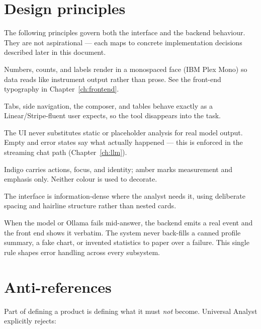 \section{Design principles}
The following principles govern both the interface and the backend behaviour.
They are not aspirational --- each maps to concrete implementation decisions
described later in this document.

\begin{description}[style=nextline,leftmargin=0pt]
  \item[\textcolor{uaIndigoD}{Readouts are exact.}]
    Numbers, counts, and labels render in a monospaced face (IBM Plex Mono) so
    data reads like instrument output rather than prose. See the front-end
    typography in Chapter~\ref{ch:frontend}.
  \item[\textcolor{uaIndigoD}{Earned familiarity.}]
    Tabs, side navigation, the composer, and tables behave exactly as a
    Linear/Stripe-fluent user expects, so the tool disappears into the task.
  \item[\textcolor{uaIndigoD}{No fabrication.}]
    The UI never substitutes static or placeholder analysis for real model
    output. Empty and error states say what actually happened --- this is
    enforced in the streaming chat path (Chapter~\ref{ch:llm}).
  \item[\textcolor{uaIndigoD}{One signal, one job.}]
    Indigo carries actions, focus, and identity; amber marks measurement and
    emphasis only. Neither colour is used to decorate.
  \item[\textcolor{uaIndigoD}{Density with rhythm.}]
    The interface is information-dense where the analyst needs it, using
    deliberate spacing and hairline structure rather than nested cards.
\end{description}

\begin{uanote}
When the model or Ollama fails mid-answer, the backend emits a real
 event and the front end shows it verbatim. The system never
back-fills a canned profile summary, a fake chart, or invented statistics to
paper over a failure. This single rule shapes error handling across every
subsystem.
\end{uanote}

\section{Anti-references}
Part of defining a product is defining what it must \emph{not} become. Universal
Analyst explicitly rejects:

